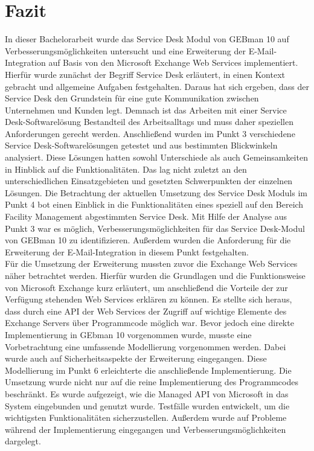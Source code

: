 \section{Fazit}

\noindent
In dieser Bachelorarbeit wurde das Service Desk Modul von GEBman 10 auf Verbesserungsmöglichkeiten untersucht und eine Erweiterung der E-Mail-Integration auf Basis von den Microsoft Exchange Web Services implementiert. Hierfür wurde zunächst der Begriff Service Desk erläutert, in einen Kontext gebracht und allgemeine Aufgaben festgehalten. Daraus hat sich ergeben, dass der Service Desk den Grundstein für eine gute Kommunikation zwischen Unternehmen und Kunden legt. Demnach ist das Arbeiten mit einer Service Desk-Softwarelösung Bestandteil des Arbeitsalltags und muss daher speziellen Anforderungen gerecht werden.\newline
Anschließend wurden im Punkt 3 verschiedene Service Desk-Softwarelösungen getestet und aus bestimmten Blickwinkeln analysiert. Diese Lösungen hatten sowohl Unterschiede als auch Gemeinsamkeiten in Hinblick auf die Funktionalitäten. Das lag nicht zuletzt an den unterschiedlichen Einsatzgebieten und gesetzten Schwerpunkten der einzelnen Lösungen.\newline
Die Betrachtung der aktuellen Umsetzung des Service Desk Moduls im Punkt 4 bot einen Einblick in die Funktionalitäten eines speziell auf den Bereich Facility Management abgestimmten Service Desk. Mit Hilfe der Analyse aus Punkt 3 war es möglich, Verbesserungsmöglichkeiten für das Service Desk-Modul von GEBman 10 zu identifizieren. Außerdem wurden die Anforderung für die Erweiterung der E-Mail-Integration in diesem Punkt festgehalten. \\

\noindent
Für die Umsetzung der Erweiterung mussten zuvor die Exchange Web Services näher betrachtet werden. Hierfür wurden die Grundlagen und die Funktionsweise von Microsoft Exchange kurz erläutert, um anschließend die Vorteile der zur Verfügung stehenden Web Services erklären zu können. Es stellte sich heraus, dass durch eine API der Web Services der Zugriff auf wichtige Elemente des Exchange Servers über Programmcode möglich war. Bevor jedoch eine direkte Implementierung in GEbman 10 vorgenommen wurde, musste eine Vorbetrachtung eine umfassende Modellierung vorgenommen werden. Dabei wurde auch auf Sicherheitsaspekte der Erweiterung eingegangen. Diese Modellierung im Punkt 6 erleichterte die anschließende Implementierung.\newline
Die Umsetzung wurde nicht nur auf die reine Implementierung des Programmcodes beschränkt. Es wurde aufgezeigt, wie die Managed API von Microsoft in das System eingebunden und genutzt wurde. Testfälle wurden entwickelt, um die wichtigsten Funktionalitäten sicherzustellen.  Außerdem wurde auf Probleme während der Implementierung eingegangen und Verbesserungsmöglichkeiten dargelegt.\\\\

